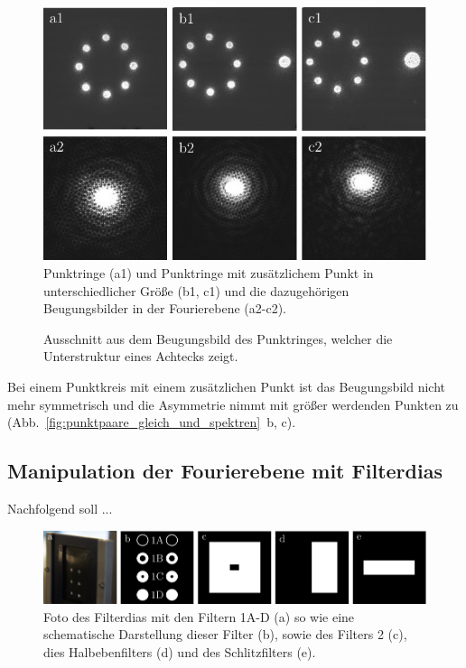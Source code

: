 \begin{figure}[h]
	\centering
	\includegraphics{images/Regina/abb17.pdf}
	\caption[Punktringe mit Fourierspektren]{
		Punktringe (a1) und Punktringe mit zusätzlichem Punkt in unterschiedlicher Größe (b1, c1) und die dazugehörigen Beugungsbilder in der Fourierebene (a2-c2).
	}
	\label{fig:punktringe_und_spektrum}
\end{figure}

\begin{figure}[h]
	\centering
	\caption[Beugungsbild der Punktringe mit Unterstruktur]{
		Ausschnitt aus dem Beugungsbild des Punktringes, welcher die Unterstruktur eines Achtecks zeigt.
	}
	\label{fig:punktringe_ausschnitt}
\end{figure}

Bei einem Punktkreis mit einem zusätzlichen Punkt ist das Beugungsbild nicht mehr symmetrisch und die Asymmetrie nimmt mit größer werdenden Punkten zu (Abb.~\ref{fig:punktpaare_gleich_und_spektren}~b, c).

\subsection{Manipulation der Fourierebene mit Filterdias}

Nachfolgend soll ... %
\begin{figure}[h]
	\centering
	\includegraphics{images/filter/abb.pdf}
	\caption[Verwendete Filter]{
		Foto des Filterdias mit den Filtern 1A-D (a) so wie eine schematische Darstellung dieser Filter (b), sowie des Filters 2 (c), dies Halbebenfilters (d) und des Schlitzfilters (e).
	}
	\label{fig:filter}
\end{figure}



